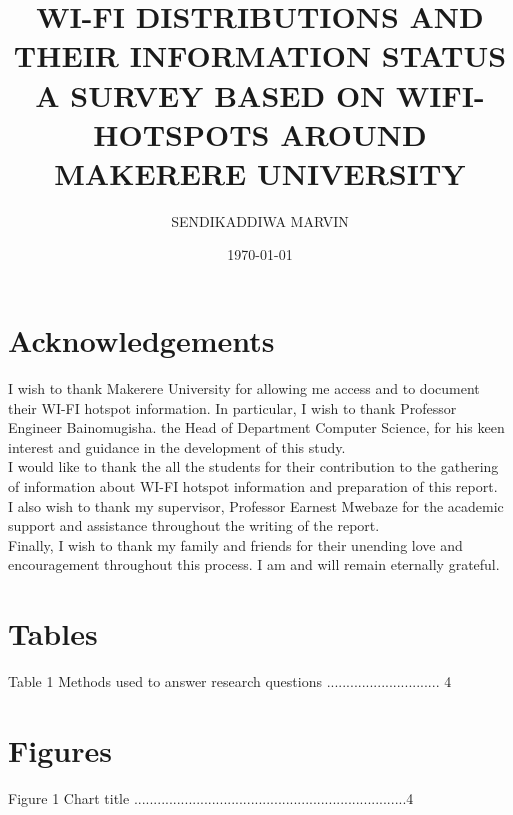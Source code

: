 \documentclass[14pt, a4paper]{article}
\begin{document}
		
				
		\title{\textbf{ WI-FI DISTRIBUTIONS AND THEIR INFORMATION STATUS}\\A SURVEY BASED ON WIFI-HOTSPOTS AROUND MAKERERE UNIVERSITY }

		
		\author{SENDIKADDIWA MARVIN}

		\date {\today}

		\maketitle

			\section{Acknowledgements}
I wish to thank Makerere University for allowing me access and to document their WI-FI hotspot information.  In particular, I wish to thank Professor Engineer Bainomugisha.  the Head of Department Computer Science, for his keen interest and guidance in the development of this study.\\



I would like to thank the all the students  for their contribution to the gathering of information about WI-FI hotspot information and preparation of this report.\\



I also wish to thank my supervisor, Professor Earnest Mwebaze for the academic support and assistance throughout the writing of the report.\\



Finally, I wish to thank my family and friends for their unending love and encouragement throughout this process.  I am and will remain eternally grateful.\\


		\tableofcontents


			\section{Tables}
Table 1 Methods used to answer research questions	............................. 4\\


			\section{Figures}
Figure 1 Chart title	......................................................................4\\
\end{document}
